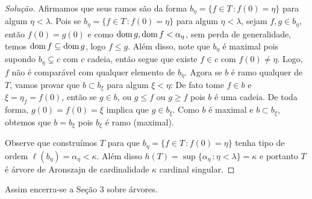 \documentclass[a4paper]{article}
\begin{document}
\begin{proof}[Solução]
 Afirmamos que seus ramos são da forma \(b_\eta=\{f\in T\,\colon f(0)=\eta\}\) para algum
 \(\eta<\lambda\). Pois se \mbox{\(b_\eta=\{f\in T\,\colon f(0)=\eta\}\)} para algum
 \(\eta<\lambda\), sejam \(f,g\in b_\eta\), então \(f(0)=g(0)\) e como
 \(\operatorname{dom} g,\operatorname{dom} f<\alpha_\eta\), sem perda de generalidade,
 temos \(\operatorname{dom} f\subseteq\operatorname{dom} g\), logo \(f\leq g\). Além disso,
 note que \(b_\eta\) é
 maximal pois supondo \(b_\eta\subsetneq c\) com \(c\) cadeia, então segue que existe
 \(f\in c\) com \(f(0)\neq\eta\). Logo, \(f\) não é comparável com qualquer
 elemento de \(b_\eta\). Agora se \(b\) é ramo qualquer de \(T\), vamos provar
 que \(b\subset b_\xi\) para algum \(\xi<\eta\): De fato tome \(f\in b\) e
 \(\xi= \eta_f=f(0)\), então se \(g\in b\), ou \(g\leq f\) ou \(g\geq f\)
 pois  \(b\) é uma cadeia. De toda forma, \(g(0)=f(0)=\xi\) implica que \( g\in
 b_\xi\). Como \(b\) é maximal e \(b\subset b_\xi\), obtemos que \(b=b_\xi\) pois
 \(b_\xi\) é ramo (maximal). 
 
 Observe que construímos \(T\) para que \(b_\eta=\{f\in T\,\colon f(0)=\eta\}\) tenha
 tipo de ordem \(\ell(b_\eta)=\alpha_\eta<\kappa\). Além disso
 \(h(T)=\sup\{\alpha_\eta\,\colon\eta<\lambda\}=\kappa\) e portanto \(T\) é
 árvore de Aronszajn de cardinalidade \(\kappa\) cardinal singular.\qedhere
 
\end{proof}

Assim encerra-se a Seção 3 sobre árvores.
  
  
\end{document}
